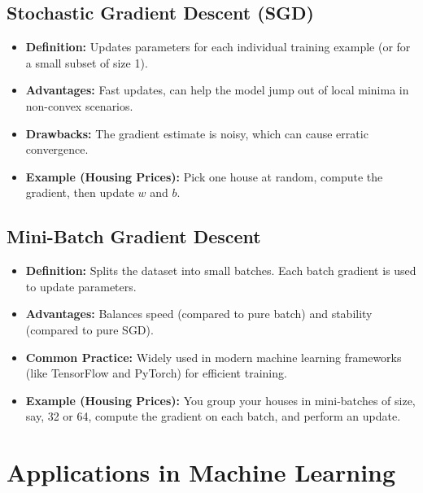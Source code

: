 \documentclass{article}
\begin{document}
\subsection{Stochastic Gradient Descent (SGD)}
\begin{itemize}
    \item \textbf{Definition:} Updates parameters for each individual training example (or for a small subset of size 1).
    \item \textbf{Advantages:} Fast updates, can help the model jump out of local minima in non-convex scenarios.
    \item \textbf{Drawbacks:} The gradient estimate is noisy, which can cause erratic convergence.
    \item \textbf{Example (Housing Prices):} Pick one house at random, compute the gradient, then update \(w\) and \(b\).
\end{itemize}

\subsection{Mini-Batch Gradient Descent}
\begin{itemize}
    \item \textbf{Definition:} Splits the dataset into small batches. Each batch gradient is used to update parameters.
    \item \textbf{Advantages:} Balances speed (compared to pure batch) and stability (compared to pure SGD).
    \item \textbf{Common Practice:} Widely used in modern machine learning frameworks (like TensorFlow and PyTorch) for efficient training.
    \item \textbf{Example (Housing Prices):} You group your houses in mini-batches of size, say, 32 or 64, compute the gradient on each batch, and perform an update.
\end{itemize}

\section{Applications in Machine Learning}
\end{document}
